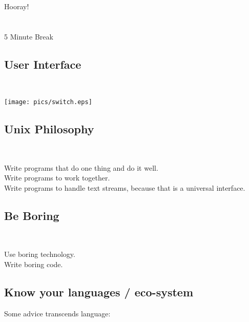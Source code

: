 \documentclass[xga]{xdvislides}
\begin{document}
\newpage
\vspace*{\fill}
\begin{center}
    \Hugesize
        Hooray! \\ [1em]
    \hspace*{5mm}
    \blueline\\
    \hspace*{5mm}\\
        5 Minute Break
\end{center}
\vspace*{\fill}

\subsection{User Interface}
\\
\vspace*{\fill}
\begin{center}
	\texttt{[image: pics/switch.eps]}
\end{center}
\vspace*{\fill}


\subsection{Unix Philosophy}
\\
\Huge
\begin{center}
	Write programs that do one thing and do it well.\\
	\vspace{.5in}
	Write programs to work together. \\
	\vspace{.5in}
	Write programs to handle text streams, because that is a universal interface.
\end{center}
\Normalsize

\subsection{Be Boring}
\\
\Huge
\begin{center}
	Use boring technology. \\
\vspace{1in}
	Write boring code.
\end{center}
\Normalsize

\subsection{Know your languages / eco-system}
Some advice transcends language: \\
\end{document}
